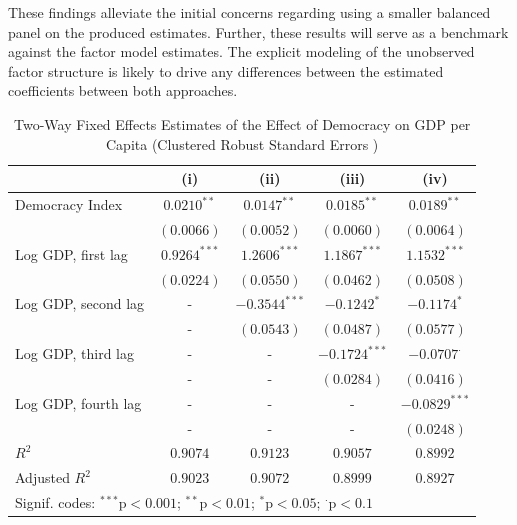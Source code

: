 These findings alleviate the initial concerns regarding using a smaller balanced panel on the produced estimates. Further, these results will serve as a benchmark against the factor model estimates. The explicit modeling of the unobserved factor structure is likely to drive any differences between the estimated coefficients between both approaches.



\begin{table}[htb]
\centering
\caption{Two-Way Fixed Effects Estimates of the Effect of Democracy on \ac{GDP} per Capita 
(Clustered Robust Standard Errors )}\label{within_results}
\begin{tabular}{lcccc}
\toprule
                       & (i) & (ii) & (iii) & (iv) \\
\midrule
Democracy Index       & $0.0210^{**}$   & $0.0147^{**}$   & $0.0185^{**}$   & $0.0189^{**}$   \\
                       & $(0.0066)$      & $(0.0052)$      & $(0.0060)$      & $(0.0064)$      \\
 Log GDP, first lag    & $0.9264^{***}$ & $1.2606^{***}$ & $1.1867^{***}$ & $1.1532^{***}$ \\
                       & $(0.0224)$      & $(0.0550)$      & $(0.0462)$      & $(0.0508)$      \\
 Log GDP, second lag   & -          & $-0.3544^{***}$ & $-0.1242^{*}$  & $-0.1174^{*}$   \\
                       & -          & $(0.0543)$     & $(0.0487)$     & $(0.0577)$     \\
Log GDP, third lag     & -          & -          & $-0.1724^{***}$ & $-0.0707^{\cdot}$ \\
                       & -          & -          & $(0.0284)$     & $(0.0416)$     \\
 Log GDP, fourth lag   & -          & -          & -          & $-0.0829^{***}$ \\
                       & -          & -          & -          & $(0.0248)$      \\
\midrule
$R^2$                 & $0.9074$    & $0.9123$    & $0.9057$    & $0.8992$    \\
  Adjusted  $R^2$      & $0.9023$    & $0.9072$    & $0.8999$    & $0.8927$    \\
\bottomrule
\multicolumn{5}{l}{Signif. codes: $^{***}$p$<0.001$; $^{**}$p$<0.01$; $^{*}$p$<0.05$; $^{\cdot}$p$<0.1$}
\end{tabular}
\end{table}




